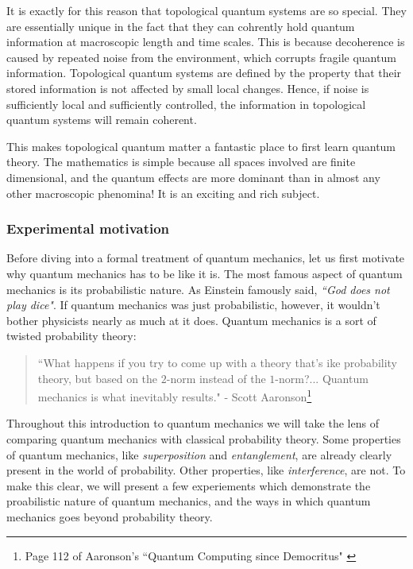 It is exactly for this reason that topological quantum systems are so special. They are essentially unique in the fact that they can cohrently hold quantum information at macroscopic length and time scales. This is because decoherence is caused by repeated noise from the environment, which corrupts fragile quantum information. Topological quantum systems are defined by the property that their stored information is not affected by small local changes. Hence, if noise is sufficiently local and sufficiently controlled, the information in topological quantum systems will remain coherent. 

This makes topological quantum matter a fantastic place to first learn quantum theory. The mathematics is simple because all spaces involved are finite dimensional, and the quantum effects are more dominant than in almost any other macroscopic phenomina! It is an exciting and rich subject.

\subsubsection{Experimental motivation}

Before diving into a formal treatment of quantum mechanics, let us first motivate why quantum mechanics has to be like it is. The most famous aspect of quantum mechanics is its probabilistic nature. As Einstein famously said, {\em ``God does not play dice"}. If quantum mechanics was just probabilistic, however, it wouldn't bother physicists nearly as much at it does. Quantum mechanics is a sort of twisted probability theory:

\begin{quote}
``What happens if you try to come up with a theory that's {\lem ike} probability theory, but based on the $2$-norm instead of the $1$-norm?... Quantum mechanics is what inevitably results." - Scott Aaronson\footnote{Page 112 of Aaronson's ``Quantum Computing since Democritus" \cite{aaronson2013quantum}}
\end{quote}

Throughout this introduction to quantum mechanics we will take the lens of comparing quantum mechanics with classical probability theory. Some properties of quantum mechanics, like {\em superposition} and {\em entanglement}, are already clearly present in the world of probability. Other properties, like {\em interference}, are not. To make this clear, we will present a few experiements which demonstrate the proabilistic nature of quantum mechanics, and the ways in which quantum mechanics goes beyond probability theory.


